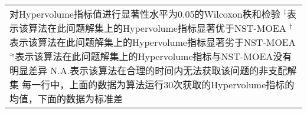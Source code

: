 {\begin{longtable}[c]{lccccccc}
    \bottomrule
    \multicolumn{8}{p{45em}}{
        对Hypervolume指标值进行显著性水平为0.05的Wilcoxon秩和检验\vspace{-.75em}\newline{}
        $^\ddag$表示该算法在此问题解集上的Hypervolume指标显著优于NST-MOEA\vspace{-.75em}\newline{}
        $^\dag$表示该算法在此问题解集上的Hypervolume指标显著劣于NST-MOEA\vspace{-.75em}\newline{}
        $^\approx$表示该算法在此问题解集上的Hypervolume指标与NST-MOEA没有明显差异\vspace{-.75em}\newline{}
        N.A.表示该算法在合理的时间内无法获取该问题的非支配解集\vspace{-.75em}\newline{}
        每一行中，上面的数据为算法运行30次获取的Hypervolume指标的均值，下面的数据为标准差
        }
\end{longtable}
}%
